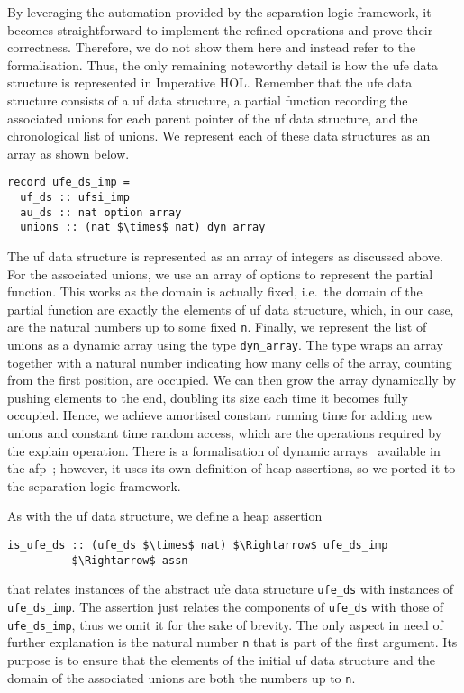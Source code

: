 \documentclass[
  sigplan,
  10pt,
  anonymous,
  review,
  ]{acmart}
\begin{document}
By leveraging the automation provided by the separation logic framework,
it becomes straightforward to implement the refined operations and prove their correctness.
Therefore, we do not show them here and instead refer to the formalisation.
Thus, the only remaining noteworthy detail is how the \acrshort{ufe} data structure is represented in Imperative HOL.
Remember that the \acrshort{ufe} data structure consists of a \acrshort{uf} data structure, a partial function recording the associated unions for each parent pointer of the \acrshort{uf} data structure, and the chronological list of unions.
We represent each of these data structures as an array as shown below.
\begin{lstlisting}
record ufe_ds_imp =
  uf_ds :: ufsi_imp
  au_ds :: nat option array
  unions :: (nat $\times$ nat) dyn_array
\end{lstlisting}
The \acrshort{uf} data structure is represented as an array of integers as discussed above.
For the associated unions, we use an array of options to represent the partial function.
This works as the domain is actually fixed, i.e.\ the domain of the partial function are exactly the elements of \acrshort{uf} data structure, which, in our case, are the natural numbers up to some fixed \lstinline|n|.
Finally, we represent the list of unions as a dynamic array using the type \lstinline|dyn_array|.
The type wraps an array together with a natural number indicating how many cells of the array, counting from the first position, are occupied.
We can then grow the array dynamically by pushing elements to the end, doubling its size each time it becomes fully occupied.
Hence, we achieve amortised constant running time for adding new unions and constant time random access, which are the operations required by the explain operation. 
There is a formalisation of dynamic arrays~\cite{imperative_hol_auto2} available in the \acrshort{afp}~\cite{imperative_hol_auto2}; 
however, it uses its own definition of heap assertions, so we ported it to the separation logic framework. 

As with the \acrshort{uf} data structure, we define a heap assertion
\begin{lstlisting}
is_ufe_ds :: (ufe_ds $\times$ nat) $\Rightarrow$ ufe_ds_imp
          $\Rightarrow$ assn
\end{lstlisting}
that relates instances of the abstract \acrshort{ufe} data structure \lstinline|ufe_ds| with instances of \lstinline|ufe_ds_imp|.
The assertion just relates the components of \lstinline|ufe_ds| with those of \lstinline|ufe_ds_imp|, thus we omit it for the sake of brevity.
The only aspect in need of further explanation is the natural number \lstinline|n| that is part of the first argument.
Its purpose is to ensure that the elements of the initial \acrshort{uf} data structure and the domain of the associated unions are both the numbers up to \lstinline|n|.
\end{document}
